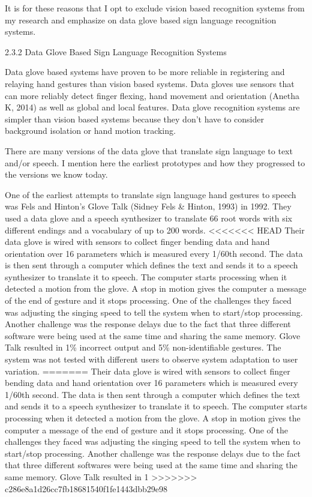 It is for these reasons that I opt to exclude vision based recognition systems from my research and emphasize on data glove based sign language recognition systems. 


2.3.2 Data Glove Based Sign Language Recognition Systems 

Data glove based systems have proven to be more reliable in registering and relaying hand gestures than vision based systems. Data gloves use sensors that can more reliably detect finger flexing, hand movement and orientation (Anetha K, 2014) as well as global and local features. Data glove recognition systems are simpler than vision based systems because they don’t have to consider background isolation or hand motion tracking. 

There are many versions of the data glove that translate sign language to text and/or speech. I mention here the earliest prototypes and how they progressed to the versions we know today. 

One of the earliest attempts to translate sign language hand gestures to speech was Fels and Hinton’s Glove Talk (Sidney Fels \& Hinton, 1993) in 1992. They used a data glove and a speech synthesizer to translate 66 root words with six different endings and a vocabulary of up to 200 words. 
<<<<<<< HEAD
Their data glove is wired with sensors to collect finger bending data and hand orientation over 16 parameters which is measured every 1/60th second. The data is then sent through a computer which defines the text and sends it to a speech synthesizer to translate it to speech. The computer starts processing when it detected a motion from the glove. A stop in motion gives the computer a message of the end of gesture and it stops processing. One of the challenges they faced was adjusting the singing speed to tell the system when to start/stop processing. Another challenge was the response delays due to the fact that three different software were being used at the same time and sharing the same memory. Glove Talk resulted in 1\% incorrect output and 5\% non-identifiable gestures. The system was not tested with different users to observe system adaptation to user variation. 
=======
Their data glove is wired with sensors to collect finger bending data and hand orientation over 16 parameters which is measured every 1/60th second. The data is then sent through a computer which defines the text and sends it to a speech synthesizer to translate it to speech. The computer starts processing when it detected a motion from the glove. A stop in motion gives the computer a message of the end of gesture and it stops processing. One of the challenges they faced was adjusting the singing speed to tell the system when to start/stop processing. Another challenge was the response delays due to the fact that three different softwares were being used at the same time and sharing the same memory. Glove Talk resulted in 1%
>>>>>>> c286e8a1d26cc7fb18681540f1fe1443dbb29e98

